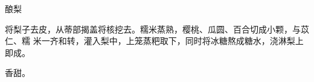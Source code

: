 \begin{recipe}{酿梨}

\ingredients


\preparation

将梨子去皮，从蒂部揭盖将核挖去。糯米蒸熟，樱桃、瓜圆、百合切成小颗，与苡仁、糯
米一齐和转，灌入梨中，上笼蒸粑取下，同时将冰糖熬成糖水，浇淋梨上即成。

\features

香甜。

\end{recipe}

